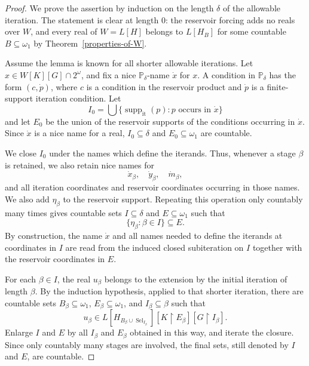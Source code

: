 \documentclass[a4paper,11pt]{article}
\newcommand{\forceP}{\mathbb{P}}
\begin{document}
\begin{proof}
We prove the assertion by induction on the length $\delta$ of the allowable
iteration.  The statement is clear at length $0$: the reservoir forcing adds
no reals over $W$, and every real of $W=L[H]$ belongs to $L[H_B]$ for some
countable $B\subseteq\omega_1$ by Theorem~\ref{properties-of-W}.

Assume the lemma is known for all shorter allowable iterations.  Let
$x\in W[K][G]\cap2^\omega$, and fix a nice $\forceP_\delta$-name $\dot x$ for
$x$.  A condition in $\forceP_\delta$ has the form
$(c,\dot p)$, where $c$ is a condition in the reservoir product and
$\dot p$ is a finite-support iteration condition.  Let
\[
   I_0=\bigcup\{\operatorname{supp}_{\mathrm{it}}(p):
        p\text{ occurs in }\dot x\}
\]
and let $E_0$ be the union of the reservoir supports of the conditions
occurring in $\dot x$.  Since $\dot x$ is a nice name for a real,
$I_0\subseteq\delta$ and $E_0\subseteq\omega_1$ are countable.

We close $I_0$ under the names which define the iterands.  Thus, whenever a
stage $\beta$ is retained, we also retain nice names for
\[
   \dot x_\beta,\quad \dot y_\beta,
   \quad \dot m_\beta,
\]
and all iteration coordinates and reservoir coordinates occurring in those
names.  We also add $\eta_\beta$ to the reservoir support.  Repeating this
operation only countably many times gives countable sets
$I\subseteq\delta$ and $E\subseteq\omega_1$ such that
\[
   \{\eta_\beta:\beta\in I\}\subseteq E.
\]
By construction, the name $\dot x$ and all names needed to define the
iterands at coordinates in $I$ are read from the induced closed subiteration
on $I$ together with the reservoir coordinates in $E$.

For each $\beta\in I$, the real $u_\beta$ belongs to the extension by the
initial iteration of length $\beta$.  By the induction hypothesis, applied
to that shorter iteration, there are countable sets
$B_\beta\subseteq\omega_1$, $E_\beta\subseteq\omega_1$, and
$I_\beta\subseteq\beta$ such that
\[
   u_\beta\in
   L[H_{B_\beta\cup\operatorname{Sel}_{I_\beta}}]
    [K\upharpoonright E_\beta]
    [G\upharpoonright I_\beta].
\]
Enlarge $I$ and $E$ by all $I_\beta$ and $E_\beta$ obtained in this way, and
iterate the closure.  Since only countably many stages are involved, the final
sets, still denoted by $I$ and $E$, are countable.


\end{proof}
\end{document}
